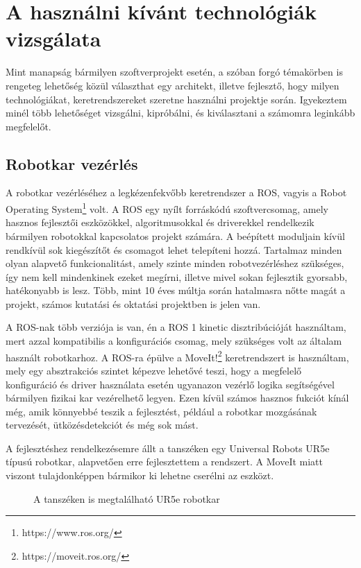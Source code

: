 \documentclass[11pt,a4paper,oneside]{article}
\newcommand{\insertfig}[4]{
	\vspace*{2mm}
	\begin{figure}[#4]
		\center
		\resizebox{#3}{!}{\texttt{[image: images/\#1]}}
		\parbox{0.8\textwidth}{\vspace*{4mm}\caption{{#2}}\small\label{fig:#1}}
	\end{figure}
	\vspace*{-2\parskip}
}
\begin{document}
\newpage

\section{A használni kívánt technológiák vizsgálata}

Mint manapság bármilyen szoftverprojekt esetén, a szóban forgó témakörben is rengeteg lehetőség közül választhat egy architekt, illetve fejlesztő, hogy milyen technológiákat, keretrendszereket szeretne használni projektje során. Igyekeztem minél több lehetőséget vizsgálni, kipróbálni, és kiválasztani a számomra leginkább megfelelőt.

\subsection{Robotkar vezérlés}

A robotkar vezérléséhez a legkézenfekvőbb keretrendszer a ROS, vagyis a Robot Operating System\footnote{https://www.ros.org/} volt. A ROS egy nyílt forráskódú szoftvercsomag, amely hasznos fejlesztői eszközökkel, algoritmusokkal és driverekkel rendelkezik bármilyen robotokkal kapcsolatos projekt számára. A beépített moduljain kívül rendkívül sok kiegészítőt és csomagot lehet telepíteni hozzá. Tartalmaz minden olyan alapvető funkcionalitást, amely szinte minden robotvezérléshez szükséges, így nem kell mindenkinek ezeket megírni, illetve mivel sokan fejlesztik gyorsabb, hatékonyabb is lesz. Több, mint 10 éves múltja során hatalmasra nőtte magát a projekt, számos kutatási és oktatási projektben is jelen van.

A ROS-nak több verziója is van, én a ROS 1 kinetic disztribúcióját használtam, mert azzal kompatibilis a konfigurációs csomag, mely szükséges volt az általam használt robotkarhoz. A ROS-ra épülve a MoveIt!\footnote{https://moveit.ros.org/} keretrendszert is használtam, mely egy absztrakciós szintet képezve lehetővé teszi, hogy a megfelelő konfiguráció és driver használata esetén ugyanazon vezérlő logika segítségével bármilyen fizikai kar vezérelhető legyen. Ezen kívül számos hasznos fukciót kínál még, amik könnyebbé teszik a fejlesztést, például a robotkar mozgásának tervezését, ütközésdetekciót és még sok mást.

A fejlesztéshez rendelkezésemre állt a tanszéken egy Universal Robots UR5e típusú robotkar, alapvetően erre fejlesztettem a rendszert. A MoveIt miatt viszont tulajdonképpen bármikor ki lehetne cserélni az eszközt.

\insertfig{ur5e}{A tanszéken is megtalálható UR5e robotkar}{6cm}{h!}
\end{document}
